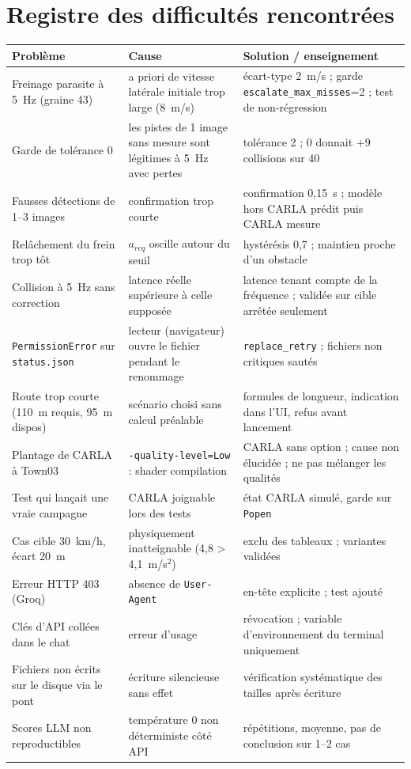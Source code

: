 \documentclass[11pt,a4paper]{article}
\providecommand{\og}{\guillemotleft\nobreakspace}
\providecommand{\fg}{\nobreakspace\guillemotright}
\newcommand{\code}[1]{\texttt{#1}}
\begin{document}
\section{Registre des difficult\'es rencontr\'ees}
\begin{longtable}{@{}p{4.2cm}p{4.8cm}p{5.8cm}@{}}\toprule
Probl\`eme & Cause & Solution / enseignement \\\midrule\endhead
Freinage parasite \`a 5~Hz (graine 43) & a priori de vitesse lat\'erale initiale trop large (8~m/s) & \'ecart-type 2~m/s ; garde \code{escalate\_max\_misses}=2 ; test de non-r\'egression \\
Garde de tol\'erance 0 & les pistes de 1 image sans mesure sont l\'egitimes \`a 5~Hz avec pertes & tol\'erance 2 ; 0 donnait +9 collisions sur 40 \\
Fausses d\'etections de 1--3 images & confirmation trop courte & confirmation 0,15~s ; mod\`ele hors CARLA pr\'edit puis CARLA mesure \\
Rel\^achement du frein trop t\^ot & $a_{req}$ oscille autour du seuil & hyst\'er\'esis 0,7 ; maintien proche d'un obstacle \\
Collision \`a 5~Hz sans correction & latence r\'eelle sup\'erieure \`a celle suppos\'ee & latence tenant compte de la fr\'equence ; valid\'ee sur cible arr\^et\'ee seulement \\
\code{PermissionError} sur \code{status.json} & lecteur (navigateur) ouvre le fichier pendant le renommage & \code{replace\_retry} ; fichiers non critiques saut\'es \\
Route trop courte (110~m requis, 95~m dispos) & scénario choisi sans calcul pr\'ealable & formules de longueur, indication dans l'UI, refus avant lancement \\
Plantage de CARLA \`a Town03 & \code{-quality-level=Low} : \og shader compilation \fg & CARLA sans option ; cause non \'elucid\'ee ; ne pas m\'elanger les qualit\'es \\
Test qui lan\c cait une vraie campagne & CARLA joignable lors des tests & \'etat CARLA simul\'e, garde sur \code{Popen} \\
Cas \og cible 30~km/h, \'ecart 20~m \fg & physiquement inatteignable (4,8 > 4,1~m/s$^2$) & exclu des tableaux ; variantes valid\'ees \\
Erreur HTTP 403 \og 1010 \fg{} (Groq) & absence de \code{User-Agent} & en-t\^ete explicite ; test ajout\'e \\
Cl\'es d'API coll\'ees dans le chat & erreur d'usage & r\'evocation ; variable d'environnement du terminal uniquement \\
Fichiers non \'ecrits sur le disque via le pont & \'ecriture silencieuse sans effet & v\'erification syst\'ematique des tailles apr\`es \'ecriture \\
Scores LLM non reproductibles & temp\'erature 0 non d\'eterministe c\^ot\'e API & r\'ep\'etitions, moyenne, pas de conclusion sur 1--2 cas \\
\bottomrule\end{longtable}
\end{document}
